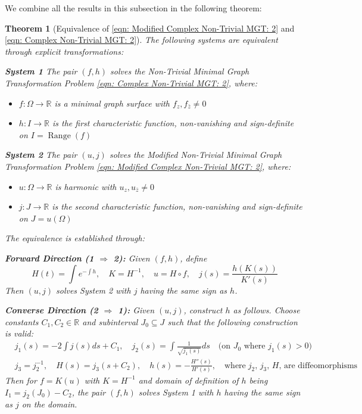 \documentclass[12pt]{article}
\theoremstyle{plain}
\newtheorem{theorem}{Theorem}[section]
\theoremstyle{definition}
\theoremstyle{remark}
\begin{document}
We combine all the results in this subsection in the following theorem:\\
 
\begin{theorem}[Equivalence of \ref{eqn: Modified Complex Non-Trivial MGT: 2} and \ref{eqn: Complex Non-Trivial MGT: 2}]\label{thm: Equivalence thm}
	The following systems are equivalent through explicit transformations:
	
	\textbf{System 1} The pair \((f,h)\) solves the Non-Trivial Minimal Graph Transformation Problem \ref{eqn: Complex Non-Trivial MGT: 2}, where:
	\begin{itemize}
		\item \(f:\Omega\to\mathbb{R}\) is a minimal graph surface with \(f_z,f_{\bar{z}}\neq 0\)
		\item \(h:I\to\mathbb{R}\) is the first characteristic function, non-vanishing and sign-definite on \(I=\operatorname{Range}(f)\)
	\end{itemize}
	
	\textbf{System 2} The pair \((u,j)\) solves the Modified Non-Trivial Minimal Graph Transformation Problem \ref{eqn: Modified Complex Non-Trivial MGT: 2}, where:
	\begin{itemize}
		\item \(u:\Omega\to\mathbb{R}\) is harmonic with \(u_z,u_{\bar{z}}\neq 0\)
		\item \(j:J\to\mathbb{R}\) is the second characteristic function, non-vanishing and sign-definite on \(J=u(\Omega)\)
	\end{itemize}
	
	The equivalence is established through:
	
	\textbf{Forward Direction (1 $\Rightarrow$ 2):} Given $(f,h)$, define
	\[
	H(t)=\int e^{-\int h},\quad K=H^{-1},\quad u=H\circ f,\quad j(s)=\frac{h(K(s))}{K'(s)}
	\]
	Then $(u,j)$ solves System 2 with $j$ having the same sign as $h$.
	
	\textbf{Converse Direction (2 $\Rightarrow$ 1):} Given $(u,j)$, construct $h$ as follows. Choose constants $C_1,C_2\in\mathbb{R}$ and subinterval $J_0\subseteq J$ such that the following construction is valid:
	\begin{align*}
		&j_1(s)=-2\int j(s)ds+C_1,\quad j_2(s)=\int\frac{1}{\sqrt{j_1(s)}}ds \quad\text{(on $J_0$ where $j_1(s)>0$)}\\
		&j_3=j_2^{-1},\quad H(s)=j_3(s+C_2),\quad h(s)=-\frac{H''(s)}{H'(s)}, \quad \text{where}\;j_2,\,j_3,\,H,\,\text{are diffeomorphisms}
	\end{align*}
	Then for $f=K(u)$ with $K=H^{-1}$ and domain of definition of \(h\) being \(I_1 = j_2(J_0)- C_2\), the pair $(f,h)$ solves System 1 with $h$ having the same sign as $j$ on the domain.\\
	

\end{theorem}
\end{document}
